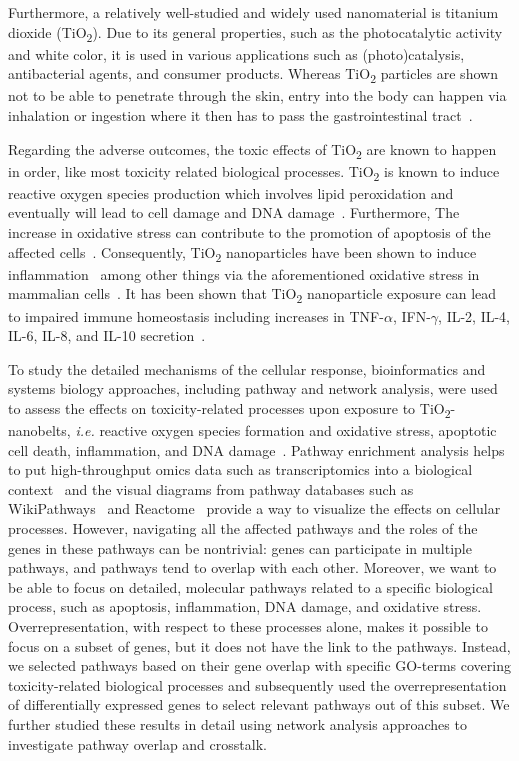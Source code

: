 \documentclass[ijms,article,submit,moreauthors,pdftex]{Definitions/mdpi}
\begin{document}
Furthermore, a relatively well-studied and widely used nanomaterial is titanium dioxide (TiO\textsubscript{2}). Due to its general properties, such as the photocatalytic activity and white color, it is used in various applications such as (photo)catalysis, antibacterial agents, and consumer products. Whereas TiO\textsubscript{2} particles are shown not to be able to penetrate through the skin, entry into the body can happen via inhalation or ingestion where it then has to pass the gastrointestinal tract~\cite{Shakeel2015,Gupta2018}. 

Regarding the adverse outcomes, the toxic effects of TiO\textsubscript{2} are known to happen in order, like most toxicity related biological processes. TiO\textsubscript{2} is known to induce reactive oxygen species production which involves lipid peroxidation and eventually will lead to cell damage and DNA damage~\cite{Hou2019,LAzou2008}. Furthermore, The increase in oxidative stress can contribute to the promotion of apoptosis of the affected cells~\cite{Circu2010,Redza-Dutordoir2016}. Consequently, TiO\textsubscript{2} nanoparticles have been shown to induce inflammation~\cite{Yan2020,Baisch2014} among other things via the aforementioned oxidative stress in mammalian cells~\cite{Hou2019,Meena2015}. It has been shown that TiO\textsubscript{2} nanoparticle exposure can lead to impaired immune homeostasis including increases in TNF-$\alpha$, IFN-$\gamma$, IL-2, IL-4, IL-6, IL-8, and IL-10 secretion~\cite{RothenRutishauser2007,Bettini2017,MedinaReyes2015}. 

To study the detailed mechanisms of the cellular response, bioinformatics and systems biology approaches, including pathway and network analysis, were used to assess the effects on toxicity-related processes upon exposure to TiO\textsubscript{2}-nanobelts, \textit{i.e.} reactive oxygen species formation and oxidative stress, apoptotic cell death, inflammation, and DNA damage~\cite{Zhang2018,Liu2019}. Pathway enrichment analysis helps to put high-throughput omics data such as transcriptomics into a biological context~\cite{Khatri2012} and the visual diagrams from pathway databases such as WikiPathways~\cite{Martens2020} and Reactome~\cite{Fabregat2017} provide a way to visualize the effects on cellular processes. However, navigating all the affected pathways and the roles of the genes in these pathways can be nontrivial: genes can participate in multiple pathways, and pathways tend to overlap with each other. Moreover, we want to be able to focus on detailed, molecular pathways related to a specific biological process, such as apoptosis, inflammation, DNA damage, and oxidative stress. Overrepresentation, with respect to these processes alone, makes it possible to focus on a subset of genes, but it does not have the link to the pathways. Instead, we selected pathways based on their gene overlap with specific GO-terms covering toxicity-related biological processes and subsequently used the overrepresentation of differentially expressed genes to select relevant pathways out of this subset. We further studied these results in detail using network analysis approaches to investigate pathway overlap and crosstalk.
\end{document}

